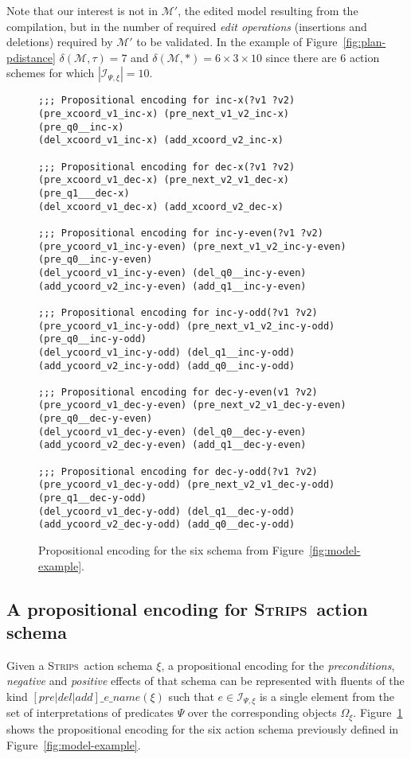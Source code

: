 \documentclass[letterpaper]{article} %
\newcommand{\strips}{\textsc{Strips}}     %
\begin{document}
Note that our interest is not in $\mathcal{M}'$, the edited model resulting from the compilation, but in the number of required {\em edit operations} (insertions and deletions) required by $\mathcal{M}'$ to be validated. In the example of Figure~\ref{fig:plan-pdistance} $\delta(\mathcal{M},\tau)=7$ and $\delta(\mathcal{M},*)=6\times 3\times 10$ since there are 6 action schemes for which $|{\mathcal I}_{\Psi,\xi}|=10$.

\begin{figure}
\begin{tiny}
\begin{verbatim}
;;; Propositional encoding for inc-x(?v1 ?v2)
(pre_xcoord_v1_inc-x) (pre_next_v1_v2_inc-x) 
(pre_q0__inc-x)
(del_xcoord_v1_inc-x) (add_xcoord_v2_inc-x)

;;; Propositional encoding for dec-x(?v1 ?v2)
(pre_xcoord_v1_dec-x) (pre_next_v2_v1_dec-x) 
(pre_q1___dec-x)
(del_xcoord_v1_dec-x) (add_xcoord_v2_dec-x)

;;; Propositional encoding for inc-y-even(?v1 ?v2)
(pre_ycoord_v1_inc-y-even) (pre_next_v1_v2_inc-y-even)
(pre_q0__inc-y-even)
(del_ycoord_v1_inc-y-even) (del_q0__inc-y-even)
(add_ycoord_v2_inc-y-even) (add_q1__inc-y-even)

;;; Propositional encoding for inc-y-odd(?v1 ?v2)
(pre_ycoord_v1_inc-y-odd) (pre_next_v1_v2_inc-y-odd) 
(pre_q0__inc-y-odd)
(del_ycoord_v1_inc-y-odd) (del_q1__inc-y-odd)
(add_ycoord_v2_inc-y-odd) (add_q0__inc-y-odd)

;;; Propositional encoding for dec-y-even(v1 ?v2)
(pre_ycoord_v1_dec-y-even) (pre_next_v2_v1_dec-y-even)
(pre_q0__dec-y-even)
(del_ycoord_v1_dec-y-even) (del_q0__dec-y-even)
(add_ycoord_v2_dec-y-even) (add_q1__dec-y-even)

;;; Propositional encoding for dec-y-odd(?v1 ?v2)
(pre_ycoord_v1_dec-y-odd) (pre_next_v2_v1_dec-y-odd)
(pre_q1__dec-y-odd)
(del_ycoord_v1_dec-y-odd) (del_q1__dec-y-odd)
(add_ycoord_v2_dec-y-odd) (add_q0__dec-y-odd)
\end{verbatim}
\end{tiny}
 \caption{\small Propositional encoding for the six schema from Figure~\ref{fig:model-example}.}
\label{fig:encoding}
\end{figure}

\subsection{A propositional encoding for \strips\ action schema}
Given a \strips\ action schema $\xi$, a propositional encoding for the {\em preconditions}, {\em negative} and {\em positive} effects of that schema can be represented with fluents of the kind $[pre|del|add]\_e\_name(\xi)$ such that $e\in{\mathcal I}_{\Psi,\xi}$ is a single element from the set of interpretations of predicates $\Psi$ over the corresponding objects $\Omega_\xi$. Figure~\ref{fig:encoding} shows the propositional encoding for the six action schema previously defined in Figure~\ref{fig:model-example}.
\end{document}
